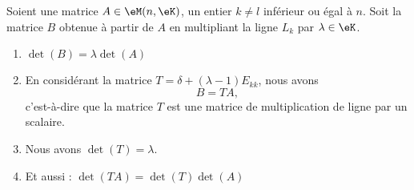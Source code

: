 \begin{proposition} \label{PROPooXUFKooOaPnna}
	Soient une matrice \( A\in \eM(n,\eK)\), un entier \( k\neq l\) inférieur ou égal à \( n\). Soit la matrice \( B\) obtenue à partir de \( A\) en multipliant la ligne \( L_k\) par \( \lambda\in \eK\).
	\begin{enumerate}
		\item       \label{ITEMooBKIGooCDQEDt}
		      \( \det(B)=\lambda\det(A)\)
		\item       \label{ITEMooWRRCooFXkRNW}
		      En considérant la matrice \( T=\delta+(\lambda-1)E_{kk}\), nous avons
		      \begin{equation}
			      B=TA,
		      \end{equation}
		      c'est-à-dire que la matrice \( T\) est une matrice de multiplication de ligne par un scalaire.
		\item       \label{ITEMooOGGDooPVVRzk}
		      Nous avons \( \det(T)=\lambda\).
		\item       \label{ITEMooIFRVooWQYgkK}
		      Et aussi : \( \det(TA)=\det(T)\det(A)\)
	\end{enumerate}
\end{proposition}

